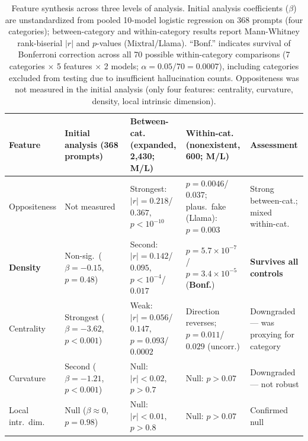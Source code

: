\begin{table}[ht]
\centering
\small
\begin{tabular}{@{}p{2.0cm}p{2.5cm}p{3.2cm}p{3.2cm}p{2.8cm}@{}}
\toprule
\textbf{Feature} & \textbf{Initial analysis} \newline (368 prompts) & \textbf{Between-cat.} \newline (expanded, 2{,}430; M/L) & \textbf{Within-cat.} \newline (nonexistent, 600; M/L) & \textbf{Assessment} \\
\midrule
Oppositeness & Not measured & Strongest: $|r|{=}0.218$/$0.367$, $p < 10^{-10}$ & $p{=}0.0046$/$0.037$; plaus.\ fake (Llama): $p{=}0.003$ & Strong between-cat.; mixed within-cat. \\
\addlinespace
\textbf{Density} & Non-sig.\ ($\beta{=}{-}0.15$, $p{=}0.48$) & Second: $|r|{=}0.142$/$0.095$, $p < 10^{-4}$/$0.017$ & $p{=}5.7{\times}10^{-7}$ / \newline $p{=}3.4{\times}10^{-5}$ (\textbf{Bonf.}) & \textbf{Survives all controls} \\
\addlinespace
Centrality & Strongest ($\beta{=}{-}3.62$, $p{<}0.001$) & Weak: $|r|{=}0.056$/$0.147$, $p{=}0.093$/$0.0002$ & Direction reverses; $p{=}0.011$/$0.029$ (uncorr.) & Downgraded --- was proxying for category \\
\addlinespace
Curvature & Second ($\beta{=}{-}1.21$, $p{<}0.001$) & Null: $|r|{<}0.02$, $p > 0.7$ & Null: $p > 0.07$ & Downgraded --- not robust \\
\addlinespace
Local intr.\ dim. & Null ($\beta{\approx}0$, $p{=}0.98$) & Null: $|r|{<}0.01$, $p > 0.8$ & Null: $p > 0.07$ & Confirmed null \\
\bottomrule
\end{tabular}
\caption{Feature synthesis across three levels of analysis. Initial analysis coefficients ($\beta$) are unstandardized from pooled 10-model logistic regression on 368 prompts (four categories); between-category and within-category results report Mann-Whitney rank-biserial $|r|$ and $p$-values (Mixtral/Llama). ``Bonf.'' indicates survival of Bonferroni correction across all 70 possible within-category comparisons (7 categories $\times$ 5 features $\times$ 2 models; $\alpha = 0.05/70 = 0.0007$), including categories excluded from testing due to insufficient hallucination counts. Oppositeness was not measured in the initial analysis (only four features: centrality, curvature, density, local intrinsic dimension).}
\label{tab:feature-synthesis}
\end{table}

